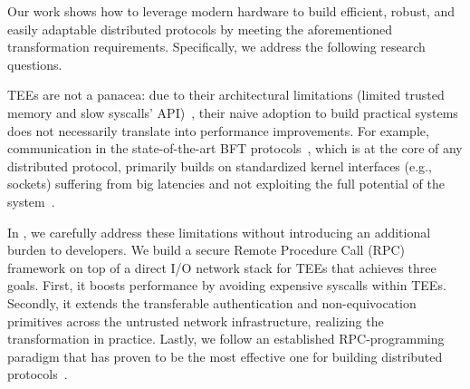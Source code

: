 



Our work shows how to leverage modern hardware to build efficient, robust, and easily adaptable distributed protocols by meeting the aforementioned transformation requirements.
Specifically, we address the following research questions.

 TEEs are not a panacea: due to their architectural limitations (limited trusted memory and slow syscalls' API)~\cite{shieldstore, treaty}, their naive adoption to build practical systems does not necessarily translate into performance improvements. For example, communication in the state-of-the-art BFT protocols~\cite{10.1145/3492321.3519568, minBFT, 10.1145/3528535.3531516}, which is at the core of any distributed protocol, primarily builds on standardized kernel interfaces (e.g., sockets) suffering from big latencies and not exploiting the full potential of the system~\cite{10.1145/3140659.3080208}. 

In \projecttitle{}, we carefully address these limitations without introducing an additional burden to developers. We build a secure Remote Procedure Call (RPC) framework on top of a direct I/O network stack for TEEs that achieves three goals. First, it boosts performance by avoiding expensive syscalls within TEEs. Secondly, it extends the transferable authentication and non-equivocation primitives across the untrusted network infrastructure, realizing the transformation in practice. Lastly, we follow an established RPC-programming paradigm that has proven to be the most effective one for building distributed protocols~\cite{Hermes:2020, farm, fasst, erpc}.%


